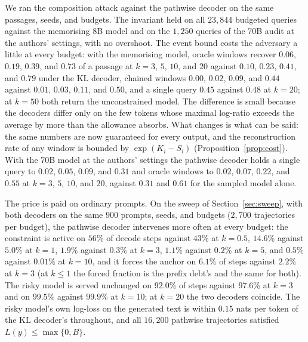 We ran the composition attack against the pathwise decoder on the same passages, seeds, and budgets. The invariant held on all $23{,}844$ budgeted queries against the memorising 8B model and on the $1{,}250$ queries of the 70B audit at the authors' settings, with no overshoot. The event bound costs the adversary a little at every budget: with the memorising model, oracle windows recover $0.06$, $0.19$, $0.39$, and $0.73$ of a passage at $k = 3$, $5$, $10$, and $20$ against $0.10$, $0.23$, $0.41$, and $0.79$ under the KL decoder, chained windows $0.00$, $0.02$, $0.09$, and $0.44$ against $0.01$, $0.03$, $0.11$, and $0.50$, and a single query $0.45$ against $0.48$ at $k=20$; at $k=50$ both return the unconstrained model. The difference is small because the decoders differ only on the few tokens whose maximal log-ratio exceeds the average by more than the allowance absorbs. What changes is what can be said: the same numbers are now guaranteed for every output, and the reconstruction rate of any window is bounded by $\exp(K_i - S_i)$ (Proposition~\ref{prop:cost}). With the 70B model at the authors' settings the pathwise decoder holds a single query to $0.02$, $0.05$, $0.09$, and $0.31$ and oracle windows to $0.02$, $0.07$, $0.22$, and $0.55$ at $k = 3$, $5$, $10$, and $20$, against $0.31$ and $0.61$ for the sampled model alone.

The price is paid on ordinary prompts. On the sweep of Section~\ref{sec:sweep}, with both decoders on the same $900$ prompts, seeds, and budgets ($2{,}700$ trajectories per budget), the pathwise decoder intervenes more often at every budget: the constraint is active on $56\%$ of decode steps against $43\%$ at $k=0.5$, $14.6\%$ against $5.0\%$ at $k=1$, $1.9\%$ against $0.3\%$ at $k=3$, $1.1\%$ against $0.2\%$ at $k=5$, and $0.5\%$ against $0.01\%$ at $k=10$, and it forces the anchor on $6.1\%$ of steps against $2.2\%$ at $k=3$ (at $k \le 1$ the forced fraction is the prefix debt's and the same for both). The risky model is served unchanged on $92.0\%$ of steps against $97.6\%$ at $k=3$ and on $99.5\%$ against $99.9\%$ at $k=10$; at $k=20$ the two decoders coincide. The risky model's own log-loss on the generated text is within $0.15$ nats per token of the KL decoder's throughout, and all $16{,}200$ pathwise trajectories satisfied $L(y) \le \max\{0, B\}$.

